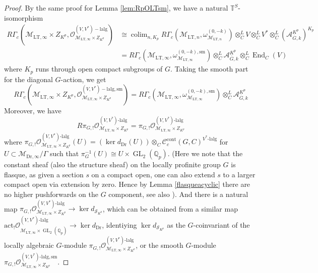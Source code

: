 \documentclass{article}
\theoremstyle{definition}
\def\calA{\mathcal{A}}
\def\calC{\mathcal{C}}
\def\calM{\mathcal{M}}
\def\calO{\mathcal{O}}
\def\calS{\mathcal{S}}
\def\bbQ{\mathbb{Q}}
\def\bbT{\mathbb{T}}
\DeclareMathOperator{\ox}{\otimes}
\def\isom{\cong}
\DeclareMathOperator{\colim}{colim}
\DeclareMathOperator{\GL}{GL}
\DeclareMathOperator{\End}{End}
\DeclareMathOperator{\cont}{cont}
\def\LT{\mathrm{LT}}
\def\sm{\mathrm{sm}}
\def\lalg{\mathrm{lalg}}
\def\bar{\overline}
\def\-{\text{-}}
\def\-{\text{-}}
\def\Dr{\mathrm{Dr}}
\begin{document}
\begin{proof}
    By the same proof for Lemma \ref{lem:RpOLTsm}, we have a natural $\bbT^S$-isomorphism 
    \begin{align*}
        R\Gamma_c(\calM_{\LT,\infty}\times Z_{K^p},\calO_{\calM_{\LT,\infty}\times Z_{K^p}}^{(V,V^*)-\lalg})&\isom\colim_{n,K_p} R\Gamma_c(\calM_{\LT,n},\omega_{\calM_{\LT,n}}^{(0,-k)})\ox_C^LV\otimes_C^L V^* \ox_C^L(\calA^{K^p}_{\bar G,k})^{K_p}
        \\
        &=R\Gamma_c(\calM_{\LT,\infty},\omega_{\calM_{\LT,\infty}}^{(0,-k),\sm})\ox_{C}^L\calA^{K^p}_{\bar G,k}\ox_C^L\End_C(V)
    \end{align*}
    where $K_p$ runs through open compact subgroups of $G$. Taking the smooth part for the diagonal $G$-action, we get
    \[ R\Gamma_c(\calM_{\LT,\infty}\times Z_{K^p},\calO_{\calM_{\LT,\infty}\times Z_{K^p}}^{(V,V^*)-\lalg,\sm})=R\Gamma_c(\calM_{\LT,\infty},\omega_{\calM_{\LT,\infty}}^{(0,-k),\sm})\ox_{C}^L\calA^{K^p}_{\bar G,k}\]
    Moreover, we have 
    \[R\pi_{G,!}\calO_{\calM_{\LT,\infty}\times Z_{K^p}}^{(V,V^*)\-\lalg}=\pi_{G,!}\calO_{\calM_{\LT,\infty}\times Z_{K^p}}^{(V,V^*)\-\lalg}\] 
    where $\pi_{G,!}\calO_{\calM_{\LT,\infty}\times Z_{K^p}}^{(V,V^*)\-\lalg}(U)=(\ker d_{\Dr}(U))\otimes_C\calC^{\cont}_c(G,C)^{V^*\-\lalg}$ for $U\subset \calM_{\Dr,\infty}/\Gamma$ such that $\pi_G^{-1}(U)\isom U\times \GL_2(\bbQ_p)$. (Here we note that the constant sheaf (also the structure sheaf) on the locally profinite group $G$ is flasque, as given a section $s$ on a compact open, one can also extend $s$ to a larger compact open via extension by zero. Hence by Lemma \ref{flasqueacyclic} there are no higher pushforwards on the $G$ component, see also \cite[Lemma 7.2]{scholze2022etale}). And there is a natural map $\pi_{G,!}\calO_{\calM_{\LT,\infty}\times Z_{K^p}}^{(V,V^*)\-\lalg}\rightarrow \ker d_{\calS_{K^p}}$, which can be obtained from a similar map $\mathrm{act}_{!}\calO_{\calM_{\LT,\infty}\times \GL_2(\bbQ_p)}^{(V,V^*)\-\lalg}\rightarrow \ker d_{\Dr}$, identiying $\ker d_{\calS_{K^p}}$ as the $G$-coinvariant of the locally algebraic $G$-module $\pi_{G,!}\calO_{\calM_{\LT,\infty}\times Z_{K^p}}^{(V,V^*)\-\lalg}$, or the smooth $G$-module $\pi_{G,!}\calO_{\calM_{\LT,\infty}\times Z_{K^p}}^{(V,V^*)\-\lalg,\sm}$. 
    

\end{proof}
\end{document}
